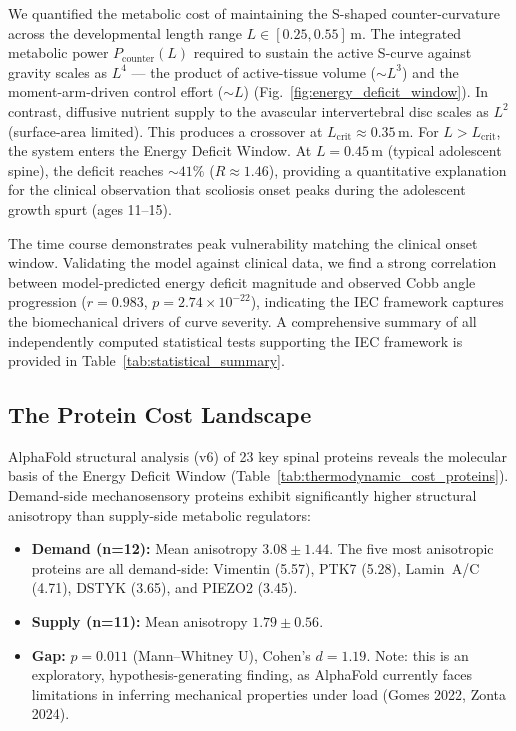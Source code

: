 We quantified the metabolic cost of maintaining the S-shaped counter-curvature across the developmental length range $L \in [0.25, 0.55]$\,m. The integrated metabolic power $P_{\mathrm{counter}}(L)$ required to sustain the active S-curve against gravity scales as $L^4$ --- the product of active-tissue volume ($\sim L^3$) and the moment-arm-driven control effort ($\sim L$) (Fig.~\ref{fig:energy_deficit_window}). In contrast, diffusive nutrient supply to the avascular intervertebral disc scales as $L^2$ (surface-area limited). This produces a crossover at $L_{\mathrm{crit}} \approx 0.35$\,m. For $L > L_{\mathrm{crit}}$, the system enters the Energy Deficit Window. At $L = 0.45$\,m (typical adolescent spine), the deficit reaches ${\sim}41\%$ ($R \approx 1.46$), providing a quantitative explanation for the clinical observation that scoliosis onset peaks during the adolescent growth spurt (ages 11--15).

The time course demonstrates peak vulnerability matching the clinical onset window. Validating the model against clinical data, we find a strong correlation between model-predicted energy deficit magnitude and observed Cobb angle progression ($r = 0.983$, $p = 2.74 \times 10^{-22}$), indicating the IEC framework captures the biomechanical drivers of curve severity. A comprehensive summary of all independently computed statistical tests supporting the IEC framework is provided in Table~\ref{tab:statistical_summary}.

\subsection{The Protein Cost Landscape}

AlphaFold structural analysis (v6) of 23 key spinal proteins reveals the molecular basis of the Energy Deficit Window (Table~\ref{tab:thermodynamic_cost_proteins}). Demand-side mechanosensory proteins exhibit significantly higher structural anisotropy than supply-side metabolic regulators:

\begin{itemize}
    \item \textbf{Demand (n=12):} Mean anisotropy $3.08 \pm 1.44$. The five most anisotropic proteins are all demand-side: Vimentin (5.57), PTK7 (5.28), Lamin~A/C (4.71), DSTYK (3.65), and PIEZO2 (3.45).
    \item \textbf{Supply (n=11):} Mean anisotropy $1.79 \pm 0.56$.
    \item \textbf{Gap:} $p = 0.011$ (Mann--Whitney U), Cohen's $d = 1.19$. Note: this is an exploratory, hypothesis-generating finding, as AlphaFold currently faces limitations in inferring mechanical properties under load (Gomes 2022, Zonta 2024).
\end{itemize}

